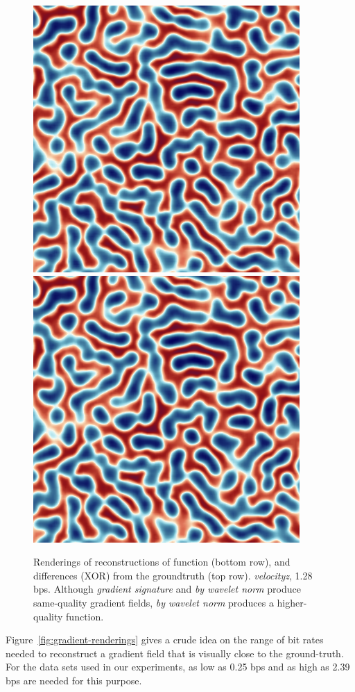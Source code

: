 \begin{figure}[h]
{	{\includegraphics[width=0.24\linewidth]{img/laplacian/curr_func2-laplacian-signature.png}}
	{\includegraphics[width=0.24\linewidth]{img/laplacian/curr_func3-laplacian-optimized.png}}}
	\caption{Renderings of reconstructions of function (bottom row), and differences (XOR) from the groundtruth (top row). \emph{velocityz}, 1.28 bps. Although \emph{gradient signature} and \emph{by wavelet norm} produce same-quality gradient fields, \emph{by wavelet norm} produces a higher-quality function.}
  \label{fig:gradient-vs-rmse}
\end{figure}

Figure~\ref{fig:gradient-renderings} gives a crude idea on the range of bit rates needed to
reconstruct a gradient field that is visually close to the ground-truth. For the data sets used in
our experiments, as low as 0.25 bps and as high as 2.39 bps are needed for this purpose.

